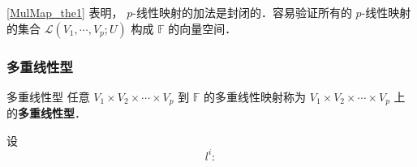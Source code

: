 \autoref{MulMap_the1} 表明， $p$-线性映射的加法是封闭的．容易验证所有的 $p$-线性映射的集合 $\mathcal{L}(V_1,\cdots,V_p;U)$ 构成 $\mathbb{F}$ 的向量空间．
\subsubsection{多重线性型}
\begin{definition}{多重线性型}
任意 $V_1\times V_2\times\cdots\times V_p$ 到 $\mathbb{F}$ 的多重线性映射称为 $V_1\times V_2\times\cdots\times V_p$ 上的\textbf{多重线性型}．
\end{definition}
\begin{example}{}
设
\begin{equation}
l^i:
\end{equation}

\end{example}